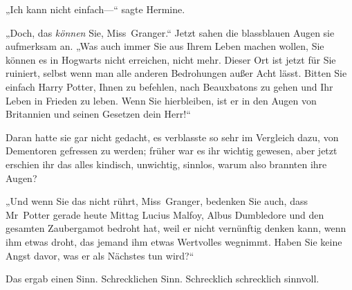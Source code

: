 „Ich kann nicht einfach—“ sagte Hermine.

„Doch, das \emph{können} Sie, Miss~Granger.“ Jetzt sahen die blassblauen Augen sie aufmerksam an. „Was auch immer Sie aus Ihrem Leben machen wollen, Sie können es in Hogwarts nicht erreichen, nicht mehr. Dieser Ort ist jetzt für Sie ruiniert, selbst wenn man alle anderen Bedrohungen außer Acht lässt. Bitten Sie einfach Harry Potter, Ihnen zu befehlen, nach Beauxbatons zu gehen und Ihr Leben in Frieden zu leben. Wenn Sie hierbleiben, ist er in den Augen von Britannien und seinen Gesetzen dein Herr!“

Daran hatte sie gar nicht gedacht, es verblasste so sehr im Vergleich dazu, von Dementoren gefressen zu werden; früher war es ihr wichtig gewesen, aber jetzt erschien ihr das alles kindisch, unwichtig, sinnlos, warum also brannten ihre Augen?

„Und wenn Sie das nicht rührt, Miss~Granger, bedenken Sie auch, dass Mr~Potter gerade heute Mittag Lucius Malfoy, Albus Dumbledore und den gesamten Zaubergamot bedroht hat, weil er nicht vernünftig denken kann, wenn ihm etwas droht, das jemand ihm etwas Wertvolles wegnimmt. Haben Sie keine Angst davor, was er als Nächstes tun wird?“

Das ergab einen Sinn. Schrecklichen Sinn. Schrecklich schrecklich sinnvoll.

